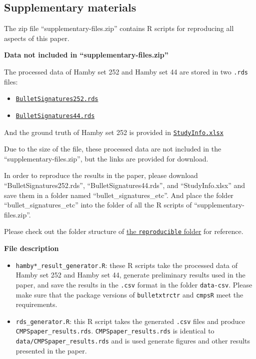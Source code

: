 \hypertarget{supplementary-materials}{%
\subsection{Supplementary materials}\label{supplementary-materials}}

The zip file ``supplementary-files.zip'' contains R scripts for
reproducing all aspects of this paper.

\textbf{Data not included in ``supplementary-files.zip''}

The processed data of Hamby set 252 and Hamby set 44 are stored in two
\texttt{.rds} files:

\begin{itemize}
\tightlist
\item
  \href{https://github.com/willju-wangqian/CMPSpaper/blob/main/reproducible/bullet_signatures_etc/BulletSignatures252.rds}{\texttt{BulletSignatures252.rds}}
\item
  \href{https://github.com/willju-wangqian/CMPSpaper/blob/main/reproducible/bullet_signatures_etc/BulletSignatures44.rds}{\texttt{BulletSignatures44.rds}}
\end{itemize}

And the ground truth of Hamby set 252 is provided in
\href{https://github.com/willju-wangqian/CMPSpaper/blob/main/reproducible/bullet_signatures_etc/StudyInfo.xlsx}{\texttt{StudyInfo.xlsx}}

Due to the size of the file, these processed data are not included in
the ``supplementary-files.zip'', but the links are provided for
download.

In order to reproduce the results in the paper, please download
``BulletSignatures252.rds'', ``BulletSignatures44.rds'', and
``StudyInfo.xlsx'' and save them in a folder named
``bullet\_signatures\_etc''. And place the folder
``bullet\_signatures\_etc'' into the folder of all the R scripts of
``supplementary-files.zip''.

Please check out the folder structure of
\href{https://github.com/willju-wangqian/CMPSpaper/tree/main/reproducible}{the
\texttt{reproducible} folder} for reference.

\textbf{File description}

\begin{itemize}
\tightlist
\item
  \texttt{hamby*\_result\_generator.R}: these R scripts take the
  processed data of Hamby set 252 and Hamby set 44, generate preliminary
  results used in the paper, and save the results in the \texttt{.csv}
  format in the folder \texttt{data-csv}. Please make sure that the
  package versions of \texttt{bulletxtrctr} and \texttt{cmpsR} meet the
  requirements.
\item
  \texttt{rds\_generator.R}: this R script takes the generated
  \texttt{.csv} files and produce \texttt{CMPSpaper\_results.rds}.
  \texttt{CMPSpaper\_results.rds} is identical to
  \texttt{data/CMPSpaper\_results.rds} and is used generate figures and
  other results presented in the paper.
\end{itemize}

